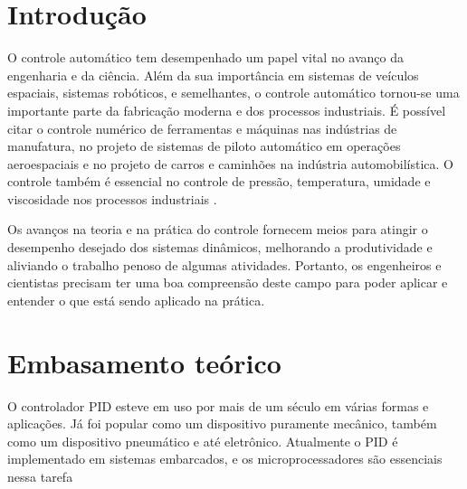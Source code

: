 \documentclass[
	12pt,				%
	openany,			%
	oneside,			%
	a4paper,			%
	english,			%
	french,				%
	spanish,			%
	brazil,				%
	]{abntex2}
\begin{document}
{%
\textual

\chapter*[Introdução]{Introdução}

O controle automático tem desempenhado um papel vital no avanço da engenharia e da ciência. Além da sua importância em sistemas de veículos espaciais, sistemas robóticos, e semelhantes, o controle automático tornou-se uma importante parte da fabricação moderna e dos processos industriais. É possível citar o controle numérico de ferramentas e máquinas nas indústrias de manufatura, no projeto de sistemas de piloto automático em operações aeroespaciais e no projeto de carros e caminhões na indústria automobilística. O controle também é essencial no controle de pressão, temperatura, umidade e viscosidade nos processos industriais \cite{ogata}.

Os avanços na teoria e na prática do controle fornecem meios para atingir o desempenho desejado dos sistemas dinâmicos, melhorando a produtividade e aliviando o trabalho penoso de algumas atividades. Portanto, os engenheiros e cientistas precisam ter uma boa compreensão deste campo para poder aplicar e entender o que está sendo aplicado na prática.




\chapter{Embasamento teórico}

O controlador PID esteve em uso por mais de um século em várias formas e aplicações. Já foi popular como um dispositivo puramente mecânico, também como um dispositivo pneumático e até eletrônico. Atualmente o PID é implementado em sistemas embarcados, e os microprocessadores são essenciais nessa tarefa \cite{timwescott1}

}
\end{document}
